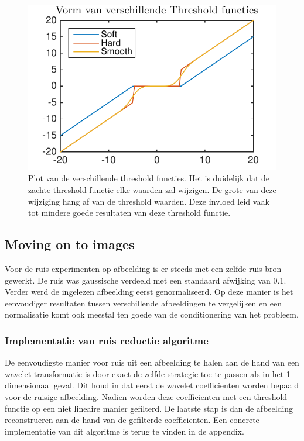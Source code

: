 \begin{figure}
\centering
\includegraphics[width=0.7\linewidth]{../src/denoising/error_1d/Threshold}
\caption{Plot van de verschillende threshold functies. Het is duidelijk dat de zachte threshold functie elke waarden zal wijzigen. De grote van deze wijziging hang af van de threshold waarden. Deze invloed leid vaak tot mindere goede resultaten van deze threshold functie.}
\label{fig:Threshold}
\end{figure}






\subsection{Moving on to images}

Voor de ruis experimenten op afbeelding is er steeds met een zelfde ruis bron gewerkt.
De ruis was gaussische verdeeld met een standaard afwijking van 0.1.
Verder werd de ingelezen afbeelding eerst genormaliseerd.
Op deze manier is het eenvoudiger resultaten tussen verschillende afbeeldingen te vergelijken en een normalisatie komt ook meestal ten goede van de conditionering van het probleem.


\subsubsection{Implementatie van ruis reductie algoritme}

De eenvoudigste manier voor ruis uit een afbeelding te halen aan de hand van een wavelet transformatie is door exact de zelfde strategie toe te passen als in het 1 dimensionaal geval.
Dit houd in dat eerst de wavelet coefficienten worden bepaald voor de ruisige afbeelding.
Nadien worden deze coefficienten met een threshold functie op een niet lineaire manier gefilterd.
De laatste stap is dan de afbeelding reconstrueren aan de hand van de gefilterde coefficienten.
Een concrete implementatie van dit algoritme is terug te vinden in de appendix.

